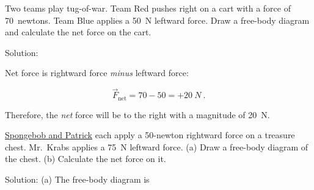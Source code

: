 \documentclass{article}
\begin{document}

\begin{example} \label{ex:FnetFromFBD} 
    Two teams play tug-of-war. Team Red pushes right on a cart with a force of \SI{70}{newtons}. Team Blue applies a \SI{50}{N} leftward force. Draw a free-body diagram and calculate the net force on the cart.
\end{example}

Solution:

\begin{center}
    
\end{center}

Net force is rightward force \textit{minus} leftward force:

\begin{equation*}
    \vec{F}_{\text{net}} = 70 - 50 = +\SI{20}{N}\ .
\end{equation*}

Therefore, the \textit{net} force will be to the right with a magnitude of \SI{20}{N}.

\begin{example}
\href{https://youtu.be/7e3XhWMHolU}{Spongebob and Patrick} each apply a 50-newton rightward force on a treasure chest. Mr.~Krabs applies a \SI{75}{N} leftward force. (a) Draw a free-body diagram of the chest. (b) Calculate the net force on it.
\end{example}

Solution: (a) The free-body diagram is
\end{document}

